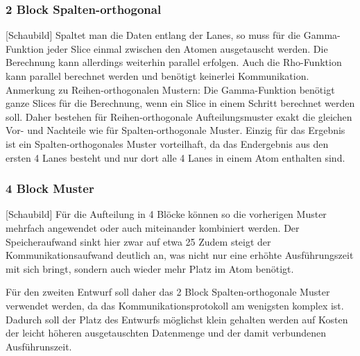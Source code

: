 \subsubsection{2 Block Spalten-orthogonal}
[Schaubild]
Spaltet man die Daten entlang der Lanes, so muss für die Gamma-Funktion jeder Slice einmal zwischen den Atomen ausgetauscht werden. Die Berechnung kann allerdings weiterhin parallel erfolgen.
Auch die Rho-Funktion kann parallel berechnet werden und benötigt keinerlei Kommunikation.
Anmerkung zu Reihen-orthogonalen Mustern:
Die Gamma-Funktion benötigt ganze Slices für die Berechnung, wenn ein Slice in einem Schritt berechnet werden soll. Daher bestehen für Reihen-orthogonale Aufteilungsmuster exakt die gleichen
Vor- und Nachteile wie für Spalten-orthogonale Muster.
Einzig für das Ergebnis ist ein Spalten-orthogonales Muster vorteilhaft, da das Endergebnis aus den ersten 4 Lanes besteht und nur dort alle 4 Lanes in einem Atom enthalten sind.

\subsubsection{4 Block Muster}
[Schaubild]
Für die Aufteilung in 4 Blöcke können so die vorherigen Muster mehrfach angewendet oder auch miteinander kombiniert werden.
Der Speicheraufwand sinkt hier zwar auf etwa 25%
Zudem steigt der Kommunikationsaufwand deutlich an, was nicht nur eine erhöhte Ausführungszeit mit sich bringt, sondern auch wieder mehr Platz im Atom benötigt.

Für den zweiten Entwurf soll daher das 2 Block Spalten-orthogonale Muster verwendet werden, da das Kommunikationsprotokoll am wenigsten komplex ist.
Dadurch soll der Platz des Entwurfs möglichst klein gehalten werden auf Kosten der leicht höheren ausgetauschten Datenmenge und der damit verbundenen Ausführunszeit.
 

